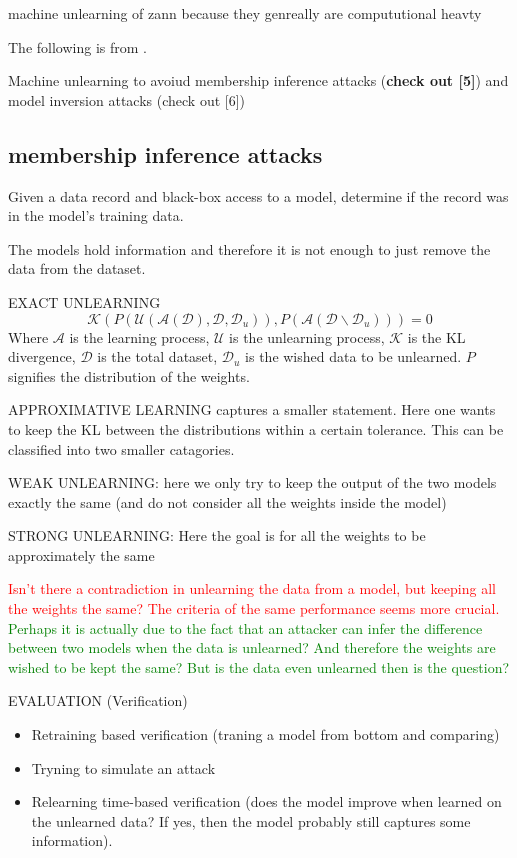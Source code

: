 
machine unlearning of zann because they genreally are compututional heavty


The following is from \cite{xu_machine_2023}.

Machine unlearning to avoiud membership inference attacks (\textbf{check out [5]}) and model inversion attacks (check out [6])

\subsection{membership inference attacks}
Given a data record and black-box access to a model, determine if the record was in the model's training data. 




The models hold information and therefore it is not enough to just remove the data from the dataset. 


EXACT UNLEARNING
\[
    \mathcal{K}(P(\mathcal{U}(\mathcal{A}(\mathcal{D}),\mathcal{D},\mathcal{D}_u)), 
    P(\mathcal{A}(\mathcal{D}\backslash\mathcal{D}_u)))=0
\]
Where $\mathcal{A}$ is the learning process, $\mathcal{U}$ is the unlearning process, $\mathcal{K}$ is the KL divergence, $\mathcal{D}$ is the total dataset, $\mathcal{D}_u$ is the wished data to be unlearned. $P$ signifies the distribution of the weights.



APPROXIMATIVE LEARNING captures a smaller statement. Here one wants to keep the KL between the distributions within a certain tolerance. This can be classified into two smaller catagories.

WEAK UNLEARNING: here we only try to keep the output of the two models exactly the same (and do not consider all the weights inside the model)

STRONG UNLEARNING: Here the goal is for all the weights to be approximately the same

\textcolor{red}{Isn't there a contradiction in unlearning the data from a model, but keeping all the weights the same? The criteria of the same performance seems more crucial. }
\textcolor{green}{Perhaps it is actually due to the fact that an attacker can infer the difference between two models when the data is unlearned? And therefore the weights are wished to be kept the same? But is the data even unlearned then is the question?}


EVALUATION (Verification)
\begin{itemize}
    \item Retraining based verification (traning a model from bottom and comparing)
    \item Tryning to simulate an attack
    \item Relearning time-based verification (does the model improve when learned on the unlearned data? If yes, then the model probably still captures some information).
\end{itemize}



